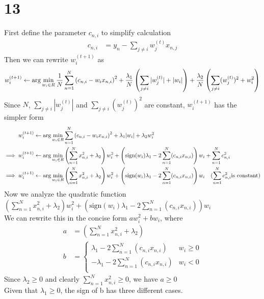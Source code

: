 \documentclass[11pt]{article}
\let\mathbb\relax
\theoremstyle{definition}
\begin{document}
\section*{13}
First define the parameter $c_{n, i}$ to simplify calculation
\begin{align*}
  c_{n, i} &= y_n - \sum_{j \neq i}w^{(t)}_jx_{n, j}
\end{align*}
Then we can rewrite $w^{(t + 1)}_i$ as
\[
  w^{(t + 1)}_i\leftarrow\arg\min_{w_i\in\mathbb{R}}\frac{1}{N}\sum_{n = 1}^N\left(c_{n, i} - w_ix_{n, i}\right)^2 + \frac{\lambda_1}{N}\left(\sum_{j\neq i}|w_j^{(t)}| + |w_i|\right) + \frac{\lambda_2}{N}\left(\sum_{j \neq i}(w_j^{(t)})^2 + w_i^2\right)
\]
Since $N$, $\sum_{j\neq i}|w_j^{(t)}|$ and $\sum_{j \neq i}(w_j^{(t)})^2$ are constant, $w^{(t + 1)}_i$ has the simpler form
\begin{align*}
  w^{(t + 1)}_i&\leftarrow\arg\min_{w_i\in\mathbb{R}}\sum_{n = 1}^N\left(c_{n, i} - w_ix_{n, i}\right)^2 + \lambda_1|w_i| + \lambda_2w_i^2 \\ 
  \implies w^{(t + 1)}_i&\leftarrow\arg\min_{w_i\in\mathbb{R}}\left(\sum_{n = 1}^Nx_{n, i}^2 + \lambda_2\right)w_i^2 + \left(\text{sign}(w_i)\lambda_1 - 2\sum_{n = 1}^N(c_{n, i}x_{n, i})\right)w_i + \sum_{n = 1}^Nc_{n, i}^2 \\ 
  \implies w^{(t + 1)}_i&\leftarrow\arg\min_{w_i\in\mathbb{R}}\left(\sum_{n = 1}^Nx_{n, i}^2 + \lambda_2\right)w_i^2 + \left(\text{sign}(w_i)\lambda_1 - 2\sum_{n = 1}^N(c_{n, i}x_{n, i})\right)w_i\quad(\sum_{n = 1}^Nc_{n, i}^2\text{is constant})
\end{align*}
Now we analyze the quadratic function $\left(\sum_{n = 1}^Nx_{n, i}^2 + \lambda_2\right)w_i^2 + \left(\text{sign}(w_i)\lambda_1 - 2\sum_{n = 1}^N(c_{n, i}x_{n, i})\right)w_i$ \\ 
We can rewrite this in the concise form  $aw_i^2 + bw_i$, where
\begin{align*}
  a &= \left(\sum_{n = 1}^Nx_{n, i}^2 + \lambda_2\right) \\ 
  b &= 
  \begin{cases}
    \lambda_1 - 2\sum_{n = 1}^N(c_{n, i}x_{n, i}) & w_i \geq 0 \\ 
    -\lambda_1 - 2\sum_{n = 1}^N(c_{n, i}x_{n, i}) & w_i < 0 \\ 
  \end{cases}
\end{align*}
Since $\lambda_2 \geq 0$ and clearly $\sum_{n = 1}^Nx_{n, i}^2 \geq 0$, we have $a \geq 0$ \\ 
Given that $\lambda_1 \geq 0$, the sign of b has three different cases. \\ 
\end{document}
